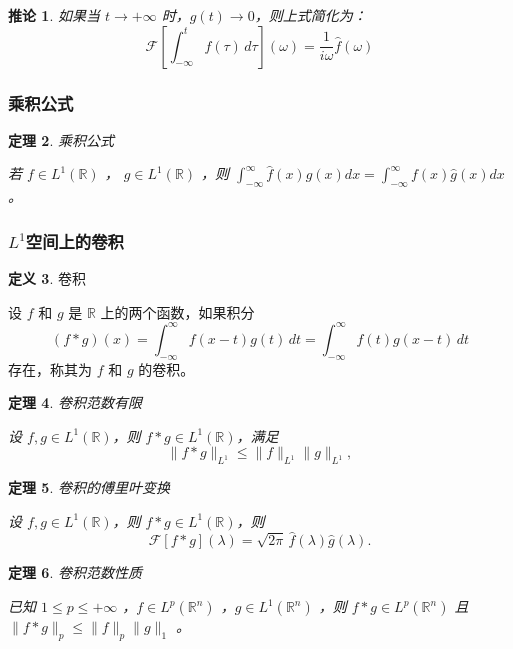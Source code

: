\documentclass[12pt,a4paper]{article}
\theoremstyle{plain}
\newtheorem{theorem}{定理}[section]
\newtheorem{corollary}[theorem]{推论}  %
\theoremstyle{definition}
\newtheorem{definition}[theorem]{定义}
\theoremstyle{remark}
\begin{document}
  \begin{corollary}
如果当 \( t \to +\infty \) 时，\( g(t) \to 0 \)，则上式简化为：
\[
\mathcal{F}\left[\int_{-\infty}^{t} f(\tau) \, d\tau\right](\omega) = \frac{1}{i\omega} \hat{f}(\omega)
\]
  \end{corollary}

 
 
 
 \subsubsection{乘积公式}
\begin{theorem}乘积公式
	
	若 \(f \in L^1(\mathbb{R})\) ， \(g \in L^1(\mathbb{R})\) ，则 \(\int_{-\infty}^{\infty}\hat{f}(x)g(x)dx = \int_{-\infty}^{\infty}f(x)\hat{g}(x)dx\) 。	
\end{theorem}

\subsubsection{$L^1$空间上的卷积}
\begin{definition}卷积
	
	设 \( f \) 和 \( g \) 是 \(\mathbb{R}\) 上的两个函数，如果积分
	\[
	(f * g)(x) = \int_{-\infty}^{\infty} f(x - t) g(t) \, dt = \int_{-\infty}^{\infty} f(t) g(x - t) \, dt
	\]
	存在，称其为 \( f \) 和 \( g \) 的卷积。
\end{definition}

\begin{theorem}卷积范数有限
	
	设 \( f, g \in L^1(\mathbb{R}) \)，则 \( f * g \in L^1(\mathbb{R}) \)，满足
	\[
	\| f * g \|_{L^1} \leq \| f \|_{L^1} \| g \|_{L^1},
	\]

\end{theorem}

\begin{theorem}卷积的傅里叶变换
	
	设 \( f, g \in L^1(\mathbb{R}) \)，则 \( f * g \in L^1(\mathbb{R}) \)，则
	\[
	\mathcal{F}[f * g](\lambda) = \sqrt{2\pi} \, \widehat{f}(\lambda) \widehat{g}(\lambda).
	\]
\end{theorem}

\begin{theorem}卷积范数性质
	
已知 \(1\leq p\leq +\infty\) ，\(f\in L^p(\mathbb{R}^n)\) ，\(g\in L^1(\mathbb{R}^n)\) ，则 \(f * g\in L^p(\mathbb{R}^n)\) 且 \(\|f * g\|_p\leq\|f\|_p\|g\|_1\) 。
\end{theorem}
\end{document}
